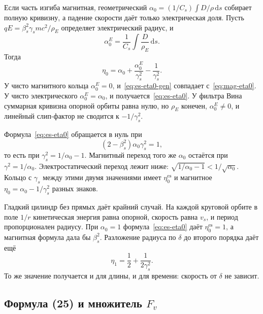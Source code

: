 \documentclass[aps,pra,preprint,a4paper,amsmath,amssymb,longbibliography]{revtex4-2}
\begin{document}
Если часть изгиба магнитная, геометрический $\alpha_0=(1/C_s)\int D/\rho\,\mathrm{d}s$ собирает полную кривизну, а падение скорости даёт только электрическая доля. Пусть $qE=\beta_s^2\gamma_s mc^2/\rho_E$ определяет электрический радиус, и
\begin{equation}
\label{eq:es-alphaE}
\alpha_0^{E}
=\frac{1}{C_s}\int\frac{D}{\rho_E}\,\mathrm{d}s.
\end{equation}
Тогда
\begin{equation}
\label{eq:es-eta0-gen}
\eta_0
=\alpha_0+\frac{\alpha_0^{E}}{\gamma_s^2}-\frac{1}{\gamma_s^2}.
\end{equation}
У чисто магнитного кольца $\alpha_0^{E}=0$, и~\eqref{eq:es-eta0-gen} совпадает с~\eqref{eq:mag-eta0}. У чисто электрического $\alpha_0^{E}=\alpha_0$, и получается~\eqref{eq:es-eta0}. У фильтра Вина суммарная кривизна опорной орбиты равна нулю, но $\rho_E$ конечен, $\alpha_0^{E}\neq 0$, и линейный слип-фактор не сводится к $-1/\gamma_s^2$.

Формула~\eqref{eq:es-eta0} обращается в нуль при
\begin{equation}
\label{eq:es-transition}
(2-\beta_s^2)\alpha_0\gamma_s^2=1,
\end{equation}
то есть при $\gamma_s^2=1/\alpha_0-1$. Магнитный переход того же $\alpha_0$ остаётся при $\gamma^2=1/\alpha_0$. Электростатический переход лежит ниже: $\sqrt{1/\alpha_0-1}<1/\sqrt{\alpha_0}$. Кольцо с $\gamma_s$ между этими двумя значениями имеет $\eta_0^{\mathrm{es}}$ и магнитное $\eta_0=\alpha_0-1/\gamma_s^2$ разных знаков.

Гладкий цилиндр без прямых даёт крайний случай. На каждой круговой орбите в поле $1/r$ кинетическая энергия равна опорной, скорость равна $v_s$, и период пропорционален радиусу. При $\alpha_0=1$ формула~\eqref{eq:es-eta0} даёт $\eta_0^{\mathrm{es}}=1$, а магнитная формула дала бы $\beta_s^2$. Разложение радиуса по $\delta$ до второго порядка даёт ещё
\begin{equation}
\label{eq:es-smooth-eta1}
\eta_1=\frac{1}{2}+\frac{1}{2\gamma_s^2}.
\end{equation}
То же значение получается и для длины, и для времени: скорость от $\delta$ не зависит.

\subsection{Формула (25) и множитель $F_v$}
\label{sec:es-fv}
\end{document}
